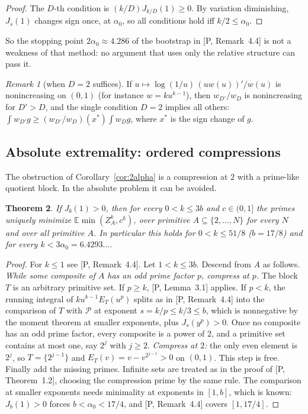 \documentclass[11pt]{article}
\newtheorem{theorem}{Theorem}[section]
\theoremstyle{remark}
\newtheorem{remark}[theorem]{Remark}
\newcommand{\Prm}{\mathcal{P}}
\newcommand{\E}{\mathbb{E}}
\begin{document}
\begin{proof}
The $D$-th condition is $(k/D)J_{k/D}(1)\ge0$. By variation diminishing, $J_s(1)$ changes sign
once, at $\alpha_0$, so all conditions hold iff $k/2\le\alpha_0$.
\end{proof}

So the stopping point $2\alpha_0\approx4.286$ of the bootstrap in [P, Remark~4.4] is not a
weakness of that method: no argument that uses only the relative structure can pass it.

\begin{remark}[when $D=2$ suffices]
If $u\mapsto\log(1/u)\,(uw(u))'/w(u)$ is nonincreasing on $(0,1)$ (for instance
$w=ku^{k-1}$), then $w_{D'}/w_D$ is nonincreasing for $D'>D$, and the single condition $D=2$
implies all others: $\int w_{D'}g\ge(w_{D'}/w_D)(x^*)\int w_Dg$, where $x^*$ is the sign change
of $g$.
\end{remark}

\subsection{Absolute extremality: ordered compressions}

The obstruction of Corollary~\ref{cor:2alpha} is a compression at $2$ with a prime-like
quotient block. In the absolute problem it can be avoided.

\begin{theorem}\label{thm:odd}
If $J_b(1)>0$, then for every $0<k\le3b$ and $c\in(0,1]$ the primes uniquely minimize
$\E\min(Z_A^k,c^k)$, over primitive $A\subseteq\{2,\dots,N\}$ for every $N$ and over all primitive
$A$. In particular this holds for $0<k\le51/8$ ($b=17/8$) and for every $k<3\alpha_0=6.4293\ldots$.
\end{theorem}

\begin{proof}
For $k\le1$ see [P, Remark~4.4]. Let $1<k\le3b$. Descend from $A$ as follows. \emph{While some
composite of $A$ has an odd prime factor $p$, compress at $p$.} The block $T$ is an
arbitrary primitive set. If $p\ge k$, [P, Lemma~3.1] applies. If $p<k$, the running integral of
$ku^{k-1}E_T(u^p)$ splits as in [P, Remark~4.4] into the comparison of $T$ with $\Prm$ at exponent
$s=k/p\le k/3\le b$, which is nonnegative by the moment theorem at smaller exponents, plus
$J_s(y^p)>0$. Once no composite has an odd prime factor, every composite is a power of $2$,
and a primitive set contains at most one, say $2^j$ with $j\ge2$. \emph{Compress at $2$:} the
only even element is $2^j$, so $T=\{2^{j-1}\}$ and $E_T(v)=v-v^{2^{j-1}}>0$ on $(0,1)$. This step is
free. Finally add the missing primes. Infinite sets are treated as in the proof of
[P, Theorem~1.2], choosing the compression prime by the same rule. The comparison at smaller
exponents needs minimality at exponents in $[1,b]$, which is known: $J_b(1)>0$ forces
$b<\alpha_0<17/4$, and [P, Remark~4.4] covers $[1,17/4]$.
\end{proof}
\end{document}
